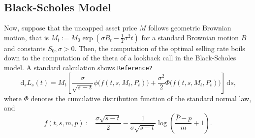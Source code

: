 \documentclass[11pt]{article}
\theoremstyle{definition}
\theoremstyle{remark}
\newcommand{\ts}{\textstyle}
\newcommand{\de}{\,\mathrm{d}}
\begin{document}
\subsection{Black-Scholes Model}
Now, suppose that the uncapped asset price $M$ follows geometric Brownian motion, that is $M_t:=M_0\exp\left(\sigma B_t-\frac{1}{2}\sigma^2 t\right)$ for a standard Brownian motion $B$ and constants $S_0, \sigma >0$. Then, the computation of the optimal selling rate boils down to the computation of the theta of a lookback call in the Black-Scholes model. A standard calculation shows
{\color{red}\texttt{Reference?}}
\[
\de_s L_s(t) = M_t\left[ \frac{\sigma}{\sqrt{s-t}}\phi\bigl(f(t,s,M_t,P_t)\bigr)+\frac{\sigma^2}{2}\Phi\bigl(f(t,s,M_t,P_t)\bigr)\right] \de s,
\]
where $\Phi$ denotes the cumulative distribution function of the standard normal law, and
\[
 f(t,s,m,p) := \frac{\sigma\sqrt{s-t}}{2} - \frac{1}{\sigma\sqrt{s-t}}\log\left(\frac{\bar{P}-p}{m}+1\right).
\]
\end{document}

